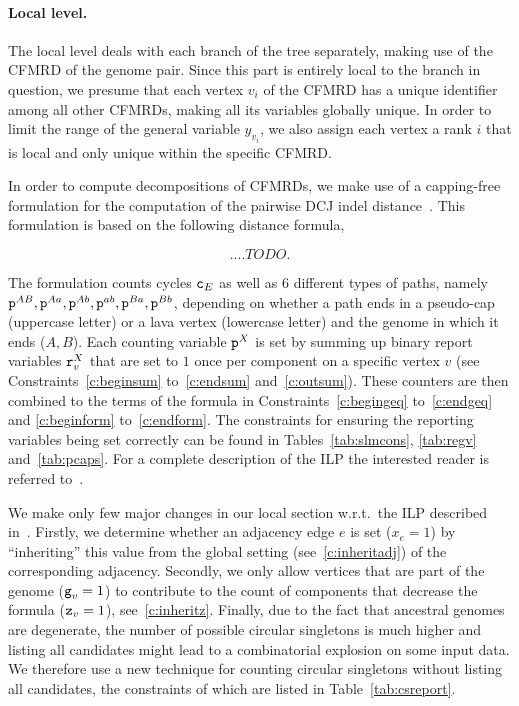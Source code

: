 \documentclass[runningheads]{llncs}
\begin{document}
\paragraph{Local level.}
The local level deals with each branch of the tree separately, making use of the CFMRD of the genome pair. Since this part is entirely local to the branch in question, we presume that each vertex $v_i$ of the CFMRD has a unique identifier among all other CFMRDs, making all its variables globally unique. In order to limit the range of the general variable $y_{v_i}$, we also assign each vertex a rank $i$ that is local and only unique within the specific CFMRD.

In order to compute decompositions of CFMRDs, we make use of a capping-free formulation for the computation of the pairwise DCJ indel distance~\cite{BOH-2024}. This formulation is based on the following distance formula,

\begin{equation}
	.... TODO.
\end{equation}

The formulation counts cycles ${\texttt{c}}_E$ as well as 6 different types of paths, namely ${\texttt{p}}^{AB},{\texttt{p}}^{Aa},{\texttt{p}}^{Ab},{\texttt{p}}^{ab},{\texttt{p}}^{Ba},{\texttt{p}}^{Bb}$, depending on whether a path ends in a pseudo-cap (uppercase letter) or a lava vertex (lowercase letter) and the genome in which it ends ($A,B$). Each counting variable ${\texttt{p}}^X$ is set by summing up binary report variables ${\texttt{r}}^X_v$ that are set to $1$ once per component on a specific vertex $v$ (see Constraints~\ref{c:beginsum} to~\ref{c:endsum} and~\ref{c:outsum}). These counters are then combined to the terms of the formula in Constraints~\ref{c:begingeq} to~\ref{c:endgeq} and \ref{c:beginform} to~\ref{c:endform}. The constraints for ensuring the reporting variables being set correctly can be found in Tables~\ref{tab:slmcons}, \ref{tab:regv} and~\ref{tab:pcaps}. For a complete description of the ILP the interested reader is referred to~\cite{BOH-2024}.

We make only few major changes in our local section w.r.t.\ the ILP described in~\cite{BOH-2024}. Firstly, we determine whether an adjacency edge $e$ is set ($x_e=1$) by ``inheriting'' this value from the global setting (see~\ref{c:inheritadj}) of the corresponding adjacency. Secondly, we only allow vertices that are part of the genome (${\texttt{g}}_v=1$) to contribute to the count of components that decrease the formula (${\texttt{z}}_v=1$), see~\ref{c:inheritz}.
Finally, due to the fact that ancestral genomes are degenerate, the number of possible circular singletons is much higher and listing all candidates might lead to a combinatorial explosion on some input data. We therefore use a new technique for counting circular singletons without listing all candidates, the constraints of which are listed in Table~\ref{tab:csreport}.
\end{document}
